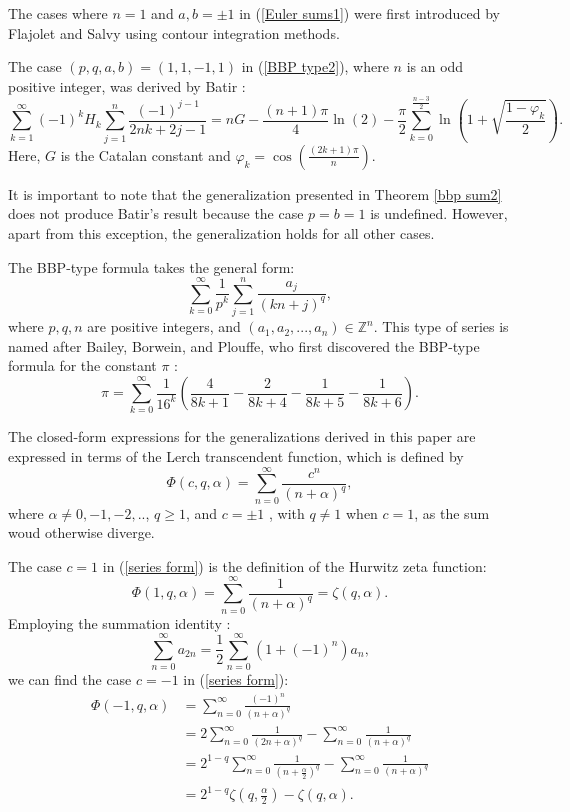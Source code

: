 \documentclass[11pt,reqno]{article}
\begin{document}
The cases where \( n = 1 \) and \( a, b = \pm 1 \) in (\ref{Euler sums1}) were first introduced by Flajolet and Salvy \cite{flaj} using contour integration methods.  

The case \((p, q, a, b) = (1, 1, -1, 1)\) in (\ref{BBP type2}), where \(n\) is an odd positive integer, was derived by Batir \cite[p.\,19]{batir}:
\[\sum_{k=1}^\infty {(-1)}^k H_k \sum_{j=1}^n \frac{{(-1)}^{j-1}}{2nk + 2j - 1} 
= nG - \frac{(n+1)\pi}{4} \ln(2) 
- \frac{\pi}{2} \sum_{k=0}^{\frac{n-3}{2}} \ln\left(1 + \sqrt{\frac{1 - \varphi_k}{2}}\right).\]
Here, \(G\) is the Catalan constant and \(\varphi_k = \cos\left(\frac{(2k + 1)\pi}{n}\right)\).

It is important to note that the generalization presented in Theorem \ref{bbp sum2} does not produce Batir's result because the case $p=b=1$ is undefined. However, apart from this exception, the generalization holds for all other cases.


The BBP-type formula takes the general form:
\[\sum_{k=0}^\infty \frac{1}{p^k}\sum_{j=1}^{n}\frac{a_j}{{(kn+j)}^q},\]
where $p,q,n$ are positive integers, and $(a_1,a_2,..., a_n)\in\mathbb{Z}^{n}$. This type of series is named after Bailey, Borwein, and Plouffe, who first discovered the BBP-type formula for the constant $\pi$ \cite[p. 903]{Bailey}:
\[\pi=\sum_{k=0}^\infty\frac{1}{{16}^{k}}\left(\frac{4}{8k+1}-\frac{2}{8k+4}-\frac{1}{8k+5}-\frac{1}{8k+6}\right).\]	

The closed-form expressions for the generalizations derived in this paper are expressed in terms of the Lerch transcendent function, which is defined by
\begin{equation}
	\Phi(c,q,\alpha) = \sum_{n=0}^\infty \frac{c^n}{{(n+\alpha)}^q}, \label{series form}
\end{equation}
where $\alpha\ne0,-1,-2,..$, $q\geqslant1$, and $c=\pm1$ , with $q\ne1$ when $c=1$, as the sum woud otherwise diverge.

The case $c=1$ in (\ref{series form}) is the definition of the Hurwitz zeta function:
\[\Phi(1,q,\alpha)=\sum_{n=0}^\infty \frac{1}{{(n+\alpha)}^q}=\zeta(q,\alpha).\]
Employing the summation identity \cite[p. 4]{ali}:
\begin{equation}
	\sum_{n=0}^\infty a_{2n}=\frac12\sum_{n=0}^\infty(1+{(-1)}^{n}) a_n,\label{a_(2k) to a_k}
\end{equation}
we can find the case $c=-1$ in (\ref{series form}):
\begin{align*}
	\Phi(-1,q,\alpha)&=\sum_{n=0}^\infty \frac{(-1)^n}{{(n+\alpha)}^q}\\
	&=2\sum_{n=0}^\infty \frac{1}{{(2n+\alpha)}^q}-\sum_{n=0}^\infty \frac{1}{{(n+\alpha)}^q}\\
	&=2^{1-q} \sum_{n=0}^\infty \frac{1}{{(n+\frac{\alpha}{2})}^q}-\sum_{n=0}^\infty \frac{1}{{(n+\alpha)}^q}\\
	&=2^{1-q}\zeta\left(q,\frac{\alpha}{2}\right)-\zeta(q,\alpha).
\end{align*}    
\end{document}
